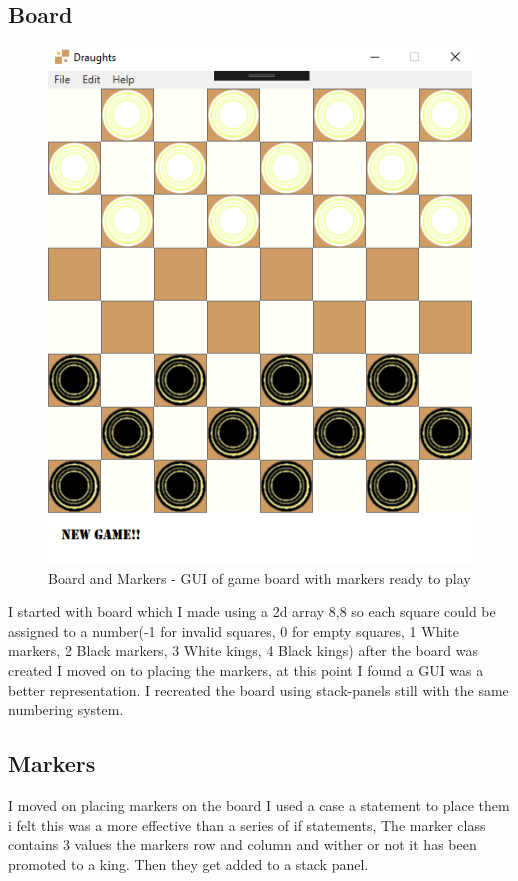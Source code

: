 \documentclass[10pt, a4paper]{article}
\begin{document}
	\subsection{Board}
	\begin{figure}[H]
  	
	\centering

  	\includegraphics[scale = 0.4]{board}
  	\caption{Board and Markers - GUI of game board with markers ready to play}
  	\label{fig:nonfloat}
	\end{figure}

	I started with board which I made using a 2d array 8,8 so each square could be assigned to a number(-1 for invalid squares, 0 for empty squares, 1 White markers, 2 Black markers, 3 White kings, 4 Black kings) after the board was created I moved on to placing the markers, at this point I found a GUI was a better representation. I recreated the board using stack-panels still with the same numbering system.
	\subsection{Markers}
	I moved on placing markers on the board I used a case a statement to place them i felt this was a more effective than a series of if statements, The marker class contains 3 values the markers row and column and wither or not it has been promoted to a king. Then they get added to a stack panel.
\end{document}
